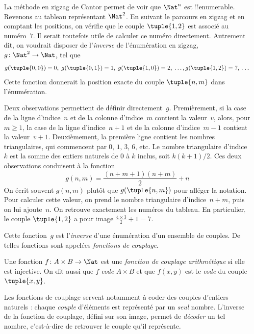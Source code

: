 \documentclass[../../../include/open-logic-section]{subfiles}
\begin{document}

\begin{explain}
La méthode en zigzag de Cantor permet de voir que $\Nat^n$ est
!!{enumerable}. Revenons au tableau représentant $\Nat^2$.
En suivant le parcours en zigzag et en comptant les positions,
on vérifie que le couple $\tuple{1,2}$ est associé au numéro~$7$.
Il serait toutefois utile de calculer ce numéro directement.
Autrement dit, on voudrait disposer de l’\emph{inverse} de
l’énumération en zigzag, $g\colon \Nat^2 \to \Nat$, tel que
\[
g(\tuple{0,0}) = 0, \;
g(\tuple{0,1}) = 1, \;
g(\tuple{1,0}) = 2, \; \dots,
g(\tuple{1,2}) = 7, \; \dots
\]
Cette fonction donnerait la position exacte du couple $\tuple{n, m}$
dans l’énumération.

Deux observations permettent de définir directement~$g$.
Premièrement, si la case de la ligne d’indice~$n$ et de la colonne
d’indice~$m$ contient la valeur~$v$, alors, pour $m\geq 1$, la case
de la ligne d’indice~$n+1$ et de la colonne d’indice~$m-1$ contient
la valeur~$v+1$. Deuxièmement, la première ligne contient les nombres
triangulaires, qui commencent par $0$, $1$, $3$, $6$, etc.
Le nombre triangulaire d’indice~$k$ est la somme des entiers naturels
de $0$ à $k$ inclus, soit $k(k+1)/2$.
%
%
%
%
Ces deux observations conduisent à la fonction
\[
  g(n,m) = \frac{(n+m+1)(n+m)}{2} + n
\]
On écrit souvent $g(n, m)$ plutôt que $g(\tuple{n, m})$ pour alléger
la notation. Pour calculer cette valeur, on prend le nombre triangulaire
d’indice~$n+m$, puis on lui ajoute~$n$. On retrouve exactement
les numéros du tableau. En particulier, le couple $\tuple{1, 2}$
a pour image $\frac{4 \times 3}{2} + 1 = 7$.

Cette fonction~$g$ est l’\emph{inverse} d’une énumération
d’un ensemble de couples. De telles fonctions sont appelées
\emph{fonctions de couplage}.
\end{explain}

\begin{defn}
Une fonction $f\colon A \times B \to \Nat$ est une
\emph{fonction de couplage arithmétique} si elle est injective.
On dit aussi que $f$ \emph{code} $A \times B$ et que $f(x,y)$
est le \emph{code} du couple $\tuple{x,y}$.
\end{defn}

\begin{explain}
Les fonctions de couplage servent notamment à coder des couples
d’entiers naturels : chaque \emph{couple} d’éléments est représenté
par un \emph{seul} nombre. L’inverse de la fonction de couplage,
défini sur son image, permet de \emph{décoder} un tel nombre,
c’est-à-dire de retrouver le couple qu’il représente.
\end{explain}
\end{document}
